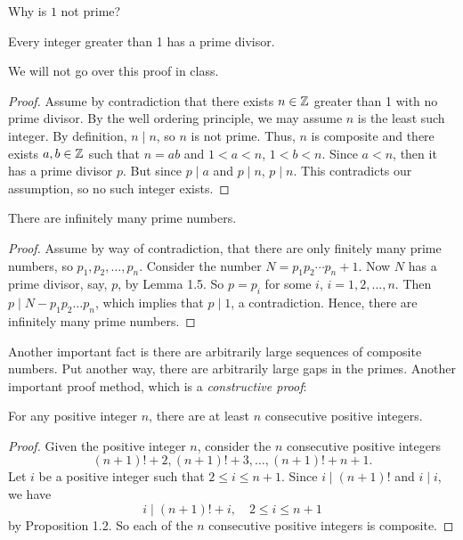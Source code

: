 \documentclass{ximera}
\begin{document}
Why is $1$ not prime?


\begin{lem*}[Lemma 1.5]\label{lem-exist-prime-divisor}
 Every integer greater than 1 has a prime divisor.
\end{lem*}

We will not go over this proof in class.

\begin{proof} 
 Assume by contradiction that there exists $n\in\mathbb Z$ greater than 1 with no prime divisor. By the well ordering principle, we may assume $n$ is the least such integer. By definition, $n\mid n$, so $n$ is not prime. Thus, $n$ is composite and there exists $a,b\in\mathbb Z$ such that $n=ab$ and $1<a<n$, $1<b<n$. Since $a<n$, then it has a prime divisor $p$. But since $p\mid a$ and $p\mid n$, $p\mid n$. This contradicts our assumption, so no such integer exists.
\end{proof}


\begin{thm}\label{infinite-primes}
 There are infinitely many prime numbers.
\end{thm}
\begin{proof}
 Assume by way of contradiction, that there are only finitely many prime numbers, so $p_1,p_2,\dots,p_n$. Consider the number $N=p_1p_2\cdots p_n +1$. Now $N$ has a prime divisor, say, $p$, by Lemma 1.5. So $p=p_i$ for some $i$, $i=1,2,\dots,n$. Then $p\mid N-p_1p_2\dots p_n$, which implies that $p\mid 1$, a contradiction. Hence, there are infinitely many prime numbers.
\end{proof}

Another important fact is there are arbitrarily large sequences of composite numbers. Put another way, there are arbitrarily large gaps in the primes. Another important proof method, which is a \emph{constructive proof}:

\begin{prop*}[Proposition 1.8]\label{aribitrary-gaps-primes}
 For any positive integer $n$, there are at least $n$ consecutive positive integers.
\end{prop*}
\begin{proof}
 Given the positive integer $n$, consider the $n$ consecutive positive integers \[(n+1)!+2, (n+1)!+3,\dots, (n+1)!+n+1.\]
 Let $i$ be a positive integer such that $2\leq i\leq n+1$. Since $i\mid (n+1)!$ and $i\mid i$, we have \[i\mid(n+1)! +i,\quad 2\leq i\leq n+1\] by Proposition 1.2. So each of the $n$ consecutive positive integers is composite.
\end{proof}
\end{document}
